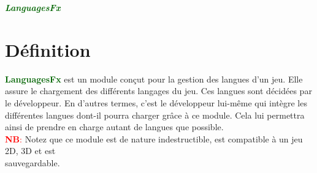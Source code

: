 \documentclass[a4paper, 11pt]{article}
\begin{document}
	\pagecolor{silver}
	\huge{\hspace{14cm}\textit{\textbf{\textcolor{darkgreen}{LanguagesFx}}}}\large{} \tableofcontents 
	\newpage
	\section{Définition}
	\textcolor{darkgreen}{\textbf{LanguagesFx}} est un module conçut pour la gestion des langues d'un jeu. 
	Elle assure le chargement des différents langages du jeu. Ces langues sont décidées par le développeur. 
	En d'autres termes, c'est le développeur lui-même qui intègre les différentes langues dont-il pourra 
	charger grâce à ce module. Cela lui permettra ainsi de prendre en charge autant de langues que possible.
	\\
	\textcolor{red}{\textbf{NB}:} Notez que ce module est de nature indestructible, est compatible à un jeu 
	2D, 3D et est \\sauvegardable.

\end{document}
